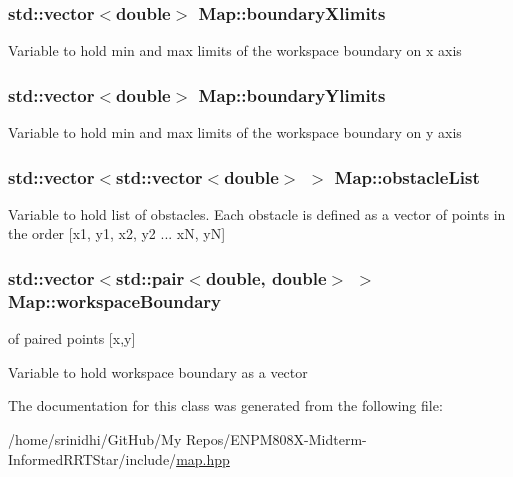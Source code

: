 \subsubsection[{\texorpdfstring{boundary\+Xlimits}{boundaryXlimits}}]{\setlength{\rightskip}{0pt plus 5cm}std\+::vector$<$double$>$ Map\+::boundary\+Xlimits}\hypertarget{classMap_a8b9bf67221211a1afa6cd05458f01e5a}{}\label{classMap_a8b9bf67221211a1afa6cd05458f01e5a}
Variable to hold min and max limits of the workspace boundary on x axis 
\subsubsection[{\texorpdfstring{boundary\+Ylimits}{boundaryYlimits}}]{\setlength{\rightskip}{0pt plus 5cm}std\+::vector$<$double$>$ Map\+::boundary\+Ylimits}\hypertarget{classMap_abbf6818140bc341cea9b30097a990d0a}{}\label{classMap_abbf6818140bc341cea9b30097a990d0a}
Variable to hold min and max limits of the workspace boundary on y axis 
\subsubsection[{\texorpdfstring{obstacle\+List}{obstacleList}}]{\setlength{\rightskip}{0pt plus 5cm}std\+::vector$<$std\+::vector$<$double$>$ $>$ Map\+::obstacle\+List}\hypertarget{classMap_a8f459ed4a725e13ae680c26dfb4a77a3}{}\label{classMap_a8f459ed4a725e13ae680c26dfb4a77a3}
Variable to hold list of obstacles. Each obstacle is defined as a vector of points in the order \mbox{[}x1, y1, x2, y2 ... xN, yN\mbox{]} 
\subsubsection[{\texorpdfstring{workspace\+Boundary}{workspaceBoundary}}]{\setlength{\rightskip}{0pt plus 5cm}std\+::vector$<$std\+::pair$<$double, double$>$ $>$ Map\+::workspace\+Boundary}\hypertarget{classMap_ad93f26cfc04f6cf732a4f534765e57f7}{}\label{classMap_ad93f26cfc04f6cf732a4f534765e57f7}


of paired points \mbox{[}x,y\mbox{]} 

Variable to hold workspace boundary as a vector 

The documentation for this class was generated from the following file\+:\begin{DoxyCompactItemize}
\item 
/home/srinidhi/\+Git\+Hub/\+My Repos/\+E\+N\+P\+M808\+X-\/\+Midterm-\/\+Informed\+R\+R\+T\+Star/include/\hyperlink{map_8hpp}{map.\+hpp}\end{DoxyCompactItemize}
